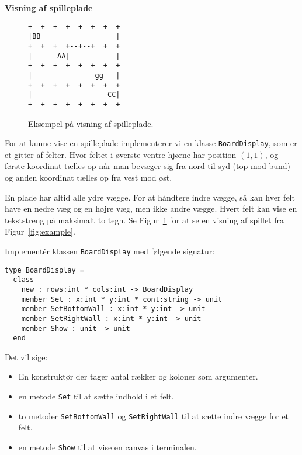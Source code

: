 \textbf{Visning af spilleplade}
\begin{figure}%
  \begin{center}
    \begin{minipage}{5cm}
\begin{verbatim}
+--+--+--+--+--+--+--+
|BB                  |
+  +  +  +--+--+  +  +
|      AA|           |
+  +  +--+  +  +  +  +
|               gg   |
+  +  +  +  +  +  +  +
|                  CC|
+--+--+--+--+--+--+--+
\end{verbatim}
    \end{minipage}
  \end{center}
  \caption{Eksempel på visning af spilleplade.}
  \label{fig:example-text}
\end{figure}

For at kunne vise en spilleplade implementerer vi en klasse
\lstinline{BoardDisplay}, som er et gitter af felter. Hvor feltet
i øverste ventre hjørne har position $(1,1)$, og første koordinat
tælles op når man bevæger sig
fra nord til syd (top mod bund) og anden koordinat tælles op fra vest mod øst.

En plade har altid alle ydre vægge. For at håndtere indre vægge, så
kan hver felt have en nedre væg og en højre væg, men ikke andre vægge.
Hvert felt kan vise en tekststreng på maksimalt to tegn. Se
Figur~\ref{fig:example-text} for at se en visning af spillet fra
Figur~\ref{fig:example}.

Implementér klassen \lstinline{BoardDisplay} med følgende signatur:

\begin{lstlisting}
type BoardDisplay =
  class
    new : rows:int * cols:int -> BoardDisplay
    member Set : x:int * y:int * cont:string -> unit
    member SetBottomWall : x:int * y:int -> unit
    member SetRightWall : x:int * y:int -> unit
    member Show : unit -> unit
  end
\end{lstlisting}

Det vil sige:
\begin{itemize}
\item En konstruktør der tager antal rækker og koloner som argumenter.
\item en metode \lstinline{Set} til at sætte indhold i et
  felt.
\item to metoder \lstinline{SetBottomWall} og \lstinline{SetRightWall}
  til at sætte indre vægge for et
  felt.
\item en metode \lstinline{Show} til at vise en canvas i
  terminalen.
\end{itemize}

